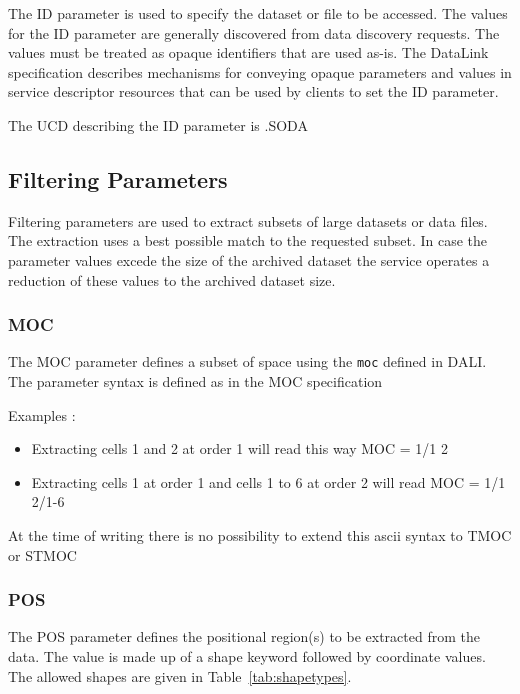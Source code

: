 \documentclass[11pt,a4paper]{ivoa}
\newcommand{\xtype}[1]{\texttt{#1}}
\begin{document}
The ID parameter is used to specify the dataset or file to
be accessed. The values for the ID parameter are generally
discovered from data discovery requests. The
values must be treated as opaque identifiers that are used
as-is. The DataLink specification describes mechanisms
for conveying opaque parameters and values in service
descriptor resources that can be used by clients to set the
ID parameter.

The UCD describing the ID parameter is
.SODA

\subsection{Filtering Parameters}

Filtering parameters are used to extract subsets of large
datasets or data files. The extraction uses a best possible match to the requested subset. In case the parameter values excede the size of the archived dataset  the service operates a reduction of these values to the archived dataset size.

\subsubsection{MOC}
The MOC parameter defines a subset of space using the \xtype{moc} defined in DALI. The parameter syntax is defined as in the MOC specification \citep{MOC2}

Examples :
\begin{itemize}

\item Extracting cells 1 and 2 at order 1 will read this way MOC = 1/1 2
\item Extracting cells 1 at order 1 and cells 1 to 6 at order 2 will read MOC = 1/1 2/1-6

\end{itemize}


At the time of writing there is no possibility to extend this ascii syntax to TMOC or STMOC

\subsubsection{POS}
\label{sec:POS}

The POS parameter defines the positional region(s) to be
extracted from the data. The value is made up of a shape
keyword followed by coordinate values. The
allowed shapes are given in Table~\ref{tab:shapetypes}.
\end{document}
